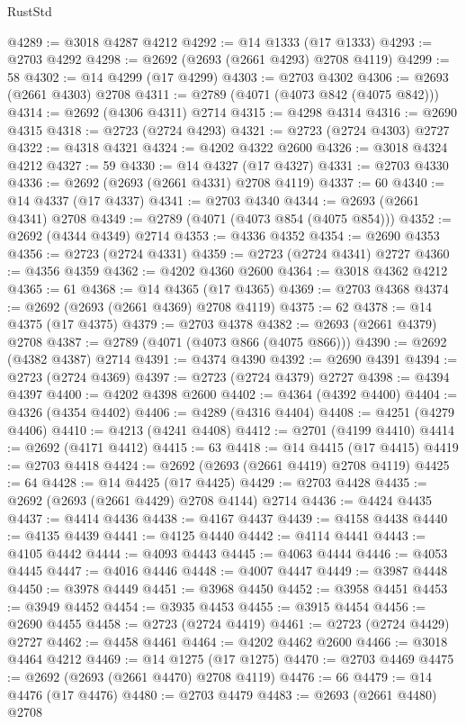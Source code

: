 \begin{lexlean}{RustStd}
\begin{coremodule}
@4289 := @3018 @4287 @4212
@4292 := @14 @1333 (@17 @1333)
@4293 := @2703 @4292
@4298 := @2692 (@2693 (@2661 @4293) @2708 @4119)
@4299 := 58
@4302 := @14 @4299 (@17 @4299)
@4303 := @2703 @4302
@4306 := @2693 (@2661 @4303) @2708
@4311 := @2789 (@4071 (@4073 @842 (@4075 @842)))
@4314 := @2692 (@4306 @4311) @2714
@4315 := @4298 @4314
@4316 := @2690 @4315
@4318 := @2723 (@2724 @4293)
@4321 := @2723 (@2724 @4303) @2727
@4322 := @4318 @4321
@4324 := @4202 @4322 @2600
@4326 := @3018 @4324 @4212
@4327 := 59
@4330 := @14 @4327 (@17 @4327)
@4331 := @2703 @4330
@4336 := @2692 (@2693 (@2661 @4331) @2708 @4119)
@4337 := 60
@4340 := @14 @4337 (@17 @4337)
@4341 := @2703 @4340
@4344 := @2693 (@2661 @4341) @2708
@4349 := @2789 (@4071 (@4073 @854 (@4075 @854)))
@4352 := @2692 (@4344 @4349) @2714
@4353 := @4336 @4352
@4354 := @2690 @4353
@4356 := @2723 (@2724 @4331)
@4359 := @2723 (@2724 @4341) @2727
@4360 := @4356 @4359
@4362 := @4202 @4360 @2600
@4364 := @3018 @4362 @4212
@4365 := 61
@4368 := @14 @4365 (@17 @4365)
@4369 := @2703 @4368
@4374 := @2692 (@2693 (@2661 @4369) @2708 @4119)
@4375 := 62
@4378 := @14 @4375 (@17 @4375)
@4379 := @2703 @4378
@4382 := @2693 (@2661 @4379) @2708
@4387 := @2789 (@4071 (@4073 @866 (@4075 @866)))
@4390 := @2692 (@4382 @4387) @2714
@4391 := @4374 @4390
@4392 := @2690 @4391
@4394 := @2723 (@2724 @4369)
@4397 := @2723 (@2724 @4379) @2727
@4398 := @4394 @4397
@4400 := @4202 @4398 @2600
@4402 := @4364 (@4392 @4400)
@4404 := @4326 (@4354 @4402)
@4406 := @4289 (@4316 @4404)
@4408 := @4251 (@4279 @4406)
@4410 := @4213 (@4241 @4408)
@4412 := @2701 (@4199 @4410)
@4414 := @2692 (@4171 @4412)
@4415 := 63
@4418 := @14 @4415 (@17 @4415)
@4419 := @2703 @4418
@4424 := @2692 (@2693 (@2661 @4419) @2708 @4119)
@4425 := 64
@4428 := @14 @4425 (@17 @4425)
@4429 := @2703 @4428
@4435 := @2692 (@2693 (@2661 @4429) @2708 @4144) @2714
@4436 := @4424 @4435
@4437 := @4414 @4436
@4438 := @4167 @4437
@4439 := @4158 @4438
@4440 := @4135 @4439
@4441 := @4125 @4440
@4442 := @4114 @4441
@4443 := @4105 @4442
@4444 := @4093 @4443
@4445 := @4063 @4444
@4446 := @4053 @4445
@4447 := @4016 @4446
@4448 := @4007 @4447
@4449 := @3987 @4448
@4450 := @3978 @4449
@4451 := @3968 @4450
@4452 := @3958 @4451
@4453 := @3949 @4452
@4454 := @3935 @4453
@4455 := @3915 @4454
@4456 := @2690 @4455
@4458 := @2723 (@2724 @4419)
@4461 := @2723 (@2724 @4429) @2727
@4462 := @4458 @4461
@4464 := @4202 @4462 @2600
@4466 := @3018 @4464 @4212
@4469 := @14 @1275 (@17 @1275)
@4470 := @2703 @4469
@4475 := @2692 (@2693 (@2661 @4470) @2708 @4119)
@4476 := 66
@4479 := @14 @4476 (@17 @4476)
@4480 := @2703 @4479
@4483 := @2693 (@2661 @4480) @2708

\end{coremodule}
\end{lexlean}

